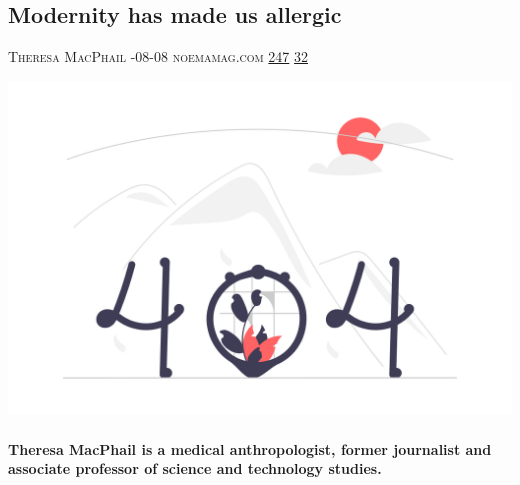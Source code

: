 \documentclass[10pt,a4paper]{article}
\begin{document}
\begin{multicols*}{2}
\begin{minipage}{\linewidth}
\subsection{Modernity has made us allergic}
\textsc{\footnotesize
{\scriptsize\faUser}\space 
Theresa MacPhail 
{\scriptsize\faCalendar}-08-08 
{\scriptsize\faGlobe}\space 
noemamag.com 
{\scriptsize\faThumbsOUp}\space 
\href{http://news.ycombinator.com/item?id=37195905\&utm\_term=comment}{247} 
{\scriptsize\faComments}\space 
\href{http://news.ycombinator.com/item?id=37195905\&utm\_term=comment}{32} 
}
\par\medskip\noindent
\href{https://www.noemamag.com/modernity-has-made-us-allergic/?utm\_source=hackernewsletter\&utm\_medium=email\&utm\_term=learn}{
    \includegraphics[width=0.99\linewidth]{notfound.png}
}
\end{minipage}
\paragraph{}
\textbf{Theresa MacPhail is a medical anthropologist, former journalist and associate professor of science and technology studies.}

\end{multicols*}
\end{document}
